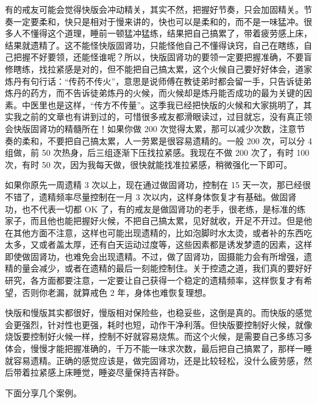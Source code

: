 \documentclass{ctexart}
\begin{document}
有的戒友可能会觉得快版会冲动精关，其实不然，把握好节奏，只会加固精关。节奏一定要柔和，快只是相对于慢来讲的，快也可以是柔和的，而不是一味猛冲。很多人不懂得这个道理，睡前一顿猛冲猛练，结果把自己搞累了，带着疲劳感上床，结果就遗精了。这不能怪快版固肾功，只能怪他自己不懂得诀窍，自己在瞎练，自己把握不好要领，还能怪谁呢？所以，快版固肾功的要领一定要把握准确，不要盲修瞎练，找拉紧感是对的，但不能把自己搞太累，这个火候自己要好好体会，道家炼丹有句行话：“传药不传火”，意思是说师傅在教徒弟时都会留一手，只告诉徒弟炼丹的药方，而不告诉徒弟炼丹的火候，而火候却是炼丹能否成功的最为关键的因素。中医里也是这样，“传方不传量”。这季我已经把快版的火候和大家挑明了，其实我之前的文章也有讲到过的，可惜很多戒友都滑眼读过，过目就忘，没有真正领会快版固肾功的精髓所在！如果你做 200 次觉得太累，那可以减少次数，注意节奏的柔和，不要把自己搞太累，人一劳累是很容易遗精的。一般 200 次，可以分 4 组做，前 50 次热身，后三组逐渐下压找拉紧感。我现在不做 200 次了，有时 100 次，有时 50 次，因为我每天做，很快就能找准拉紧感，稍微强化一下即可。

如果你原先一周遗精 3 次以上，现在通过做固肾功，控制在 15 天一次，那已经很不错了，遗精频率尽量控制在一月 3 次以内，这样身体恢复才有基础。做固肾功，也不代表一切都 OK 了，有的戒友是做固肾功的老手，很老练，是标准的练家子，而且他也能把握好火候，不把自己搞太累，见好就收，开足不开过。但是他在其他方面不注意，这样也可能出现遗精的，比如泡脚时水太烫，或者补的东西吃太多，又或者盖太厚，还有白天运动过度等，这些因素都是诱发梦遗的因素，这样即使做固肾功，也难免会出现遗精。不过，做了固肾功，固摄能力会有所增强，遗精的量会减少，或者在遗精的最后一刻能控制住。关于控遗之道，我们真的要好好研究，各方面都要注意，一定要让自己获得一个稳定的遗精频率，这样恢复才有希望，否则你老漏，就算戒色 2 年，身体也难恢复理想。

快版和慢版其实都很好，慢版相对保险些，也稳妥些，这倒是真的。而快版的感觉会更强烈，针对性也更强，耗时也短，动作干净利落。但快版要控制好火候，就像烧饭要控制好火候一样，控制不好就容易烧焦。而这个火候，是需要自己多练习多体会，慢慢才能把握准确的，千万不能一味求次数，最后把自己搞累了，那样一睡就容易遗精。正确的感觉应该是，做完固肾功，还是比较轻松，没什么疲劳感，然后带着拉紧感上床睡觉，睡姿尽量保持吉祥卧。

下面分享几个案例。
\end{document}
